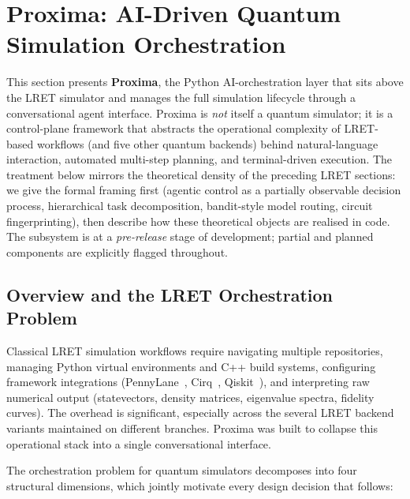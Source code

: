 \documentclass[11pt,a4paper]{article}
\begin{document}
\section[Proxima Orchestration Layer]{Proxima: AI-Driven Quantum Simulation Orchestration}
\label{sec:proxima}

This section presents \textbf{Proxima}, the Python AI-orchestration layer that sits
above the LRET simulator and manages the full simulation lifecycle through a
conversational agent interface. Proxima is \emph{not} itself a quantum simulator; it
is a control-plane framework that abstracts the operational complexity of
LRET-based workflows (and five other quantum backends) behind natural-language
interaction, automated multi-step planning, and terminal-driven execution. The
treatment below mirrors the theoretical density of the preceding LRET sections: we
give the formal framing first (agentic control as a partially observable decision
process, hierarchical task decomposition, bandit-style model routing, circuit
fingerprinting), then describe how these theoretical objects are realised in code.
The subsystem is at a \emph{pre-release} stage of development; partial and planned
components are explicitly flagged throughout.

\subsection{Overview and the LRET Orchestration Problem}

Classical LRET simulation workflows require navigating multiple repositories,
managing Python virtual environments and C++ build systems, configuring framework
integrations (PennyLane~\cite{bergholm2018pennylane}, Cirq~\cite{cirq},
Qiskit~\cite{javadi2024qiskit}), and interpreting raw numerical output
(statevectors, density matrices, eigenvalue spectra, fidelity curves). The overhead
is significant, especially across the several LRET backend variants maintained on
different branches. Proxima was built to collapse this operational stack into a
single conversational interface.

The orchestration problem for quantum simulators decomposes into four structural
dimensions, which jointly motivate every design decision that follows:
\end{document}
